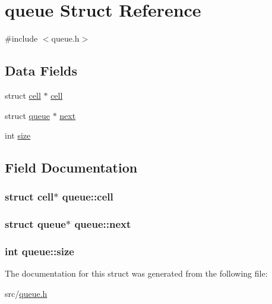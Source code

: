\hypertarget{structqueue}{\section{queue Struct Reference}
\label{structqueue}
}


{\ttfamily \#include $<$queue.\-h$>$}

\subsection*{Data Fields}
\begin{DoxyCompactItemize}
\item 
struct \hyperlink{structcell}{cell} $\ast$ \hyperlink{structqueue_a0376fee44ea11758a262bc1e46083687}{cell}
\item 
struct \hyperlink{structqueue}{queue} $\ast$ \hyperlink{structqueue_ad9a4d0c0515c80148e0ca26f99ac4feb}{next}
\item 
int \hyperlink{structqueue_afb9096840ba43e124b3a58648db557cc}{size}
\end{DoxyCompactItemize}


\subsection{Field Documentation}
\hypertarget{structqueue_a0376fee44ea11758a262bc1e46083687}{
\subsubsection[{cell}]{\setlength{\rightskip}{0pt plus 5cm}struct {\bf cell}$\ast$ queue\-::cell}}\label{structqueue_a0376fee44ea11758a262bc1e46083687}
\hypertarget{structqueue_ad9a4d0c0515c80148e0ca26f99ac4feb}{
\subsubsection[{next}]{\setlength{\rightskip}{0pt plus 5cm}struct {\bf queue}$\ast$ queue\-::next}}\label{structqueue_ad9a4d0c0515c80148e0ca26f99ac4feb}
\hypertarget{structqueue_afb9096840ba43e124b3a58648db557cc}{
\subsubsection[{size}]{\setlength{\rightskip}{0pt plus 5cm}int queue\-::size}}\label{structqueue_afb9096840ba43e124b3a58648db557cc}


The documentation for this struct was generated from the following file\-:\begin{DoxyCompactItemize}
\item 
src/\hyperlink{queue_8h}{queue.\-h}\end{DoxyCompactItemize}
